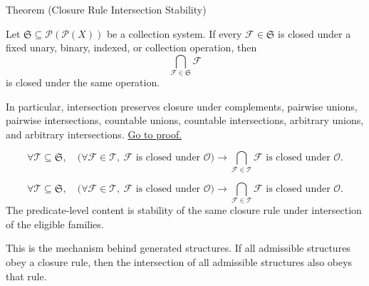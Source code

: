 \begin{theorembox}{Theorem (Closure Rule Intersection Stability)}
\begin{theorem}\label{thm:closure-rule-intersection-stability}
Let \(\mathfrak S\subseteq\mathcal P(\mathcal P(X))\) be a collection system.
If every \(\mathcal F\in\mathfrak S\) is closed under a fixed unary, binary,
indexed, or collection operation, then
\[
\bigcap_{\mathcal F\in\mathfrak S}\mathcal F
\]
is closed under the same operation.

In particular, intersection preserves closure under complements, pairwise
unions, pairwise intersections, countable unions, countable intersections,
arbitrary unions, and arbitrary intersections.
\hyperref[prf:closure-rule-intersection-stability]{Go to proof.}
\end{theorem}
\end{theorembox}

\begin{remark*}
\[
\forall \mathcal T\subseteq\mathfrak S,\quad
\bigl(\forall \mathcal F\in\mathcal T,\ \mathcal F\text{ is closed under }\mathcal O\bigr)
\to
\bigcap_{\mathcal F\in\mathcal T}\mathcal F\text{ is closed under }\mathcal O.
\]
\end{remark*}

\begin{remark*}
\[
\forall \mathcal T\subseteq\mathfrak S,\quad
\bigl(\forall \mathcal F\in\mathcal T,\ \mathcal F\text{ is closed under }\mathcal O\bigr)
\to
\bigcap_{\mathcal F\in\mathcal T}\mathcal F\text{ is closed under }\mathcal O.
\]
The predicate-level content is stability of the same closure rule under
intersection of the eligible families.
\end{remark*}

\begin{remark*}[Interpretation]
This is the mechanism behind generated structures.  If all admissible
structures obey a closure rule, then the intersection of all admissible
structures also obeys that rule.
\end{remark*}


